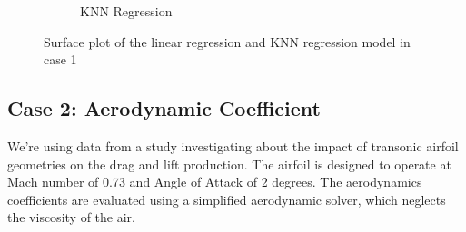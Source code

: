 \documentclass[conf]{new-aiaa}
\begin{document}
\begin{figure}[H]
\begin{subfigure}{0.4\textwidth}
        \caption{KNN Regression}
    \end{subfigure}
    \caption{\label{fig:case1_lr_knn_plane} Surface plot of the linear regression and KNN regression model in case 1}
\end{figure}


\subsection{Case 2: Aerodynamic Coefficient}
We're using data from a study investigating about the impact of transonic airfoil geometries on the drag and lift production. The airfoil is designed to operate at Mach number of 0.73 and Angle of Attack of 2 degrees. The aerodynamics coefficients are evaluated using a simplified aerodynamic solver, which neglects the viscosity of the air. 
\end{document}
